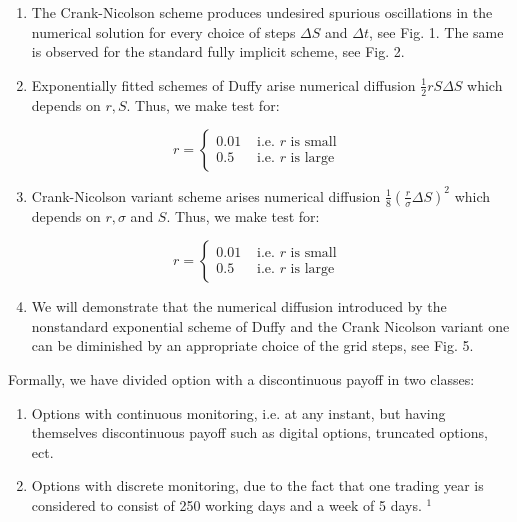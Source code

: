 \documentclass[10pt]{article}
\begin{document}
\begin{enumerate}
  \item The Crank-Nicolson scheme produces undesired spurious oscillations in the numerical solution for every choice of steps $\Delta S$ and $\Delta t$, see Fig. 1. The same is observed for the standard fully implicit scheme, see Fig. 2.
  \item Exponentially fitted schemes of Duffy arise numerical diffusion $\frac{1}{2} r S \Delta S$ which depends on $r, S$. Thus, we make test for:
\end{enumerate}

$$
r= \begin{cases}0.01 & \text { i.e. } r \text { is small } \\ 0.5 & \text { i.e. } r \text { is large }\end{cases}
$$

\begin{enumerate}
  \setcounter{enumi}{2}
  \item Crank-Nicolson variant scheme arises numerical diffusion $\frac{1}{8}\left(\frac{r}{\sigma} \Delta S\right)^{2}$ which depends on $r, \sigma$ and $S$. Thus, we make test for:
\end{enumerate}

$$
r= \begin{cases}0.01 & \text { i.e. } r \text { is small } \\ 0.5 & \text { i.e. } r \text { is large }\end{cases}
$$

\begin{enumerate}
  \setcounter{enumi}{3}
  \item We will demonstrate that the numerical diffusion introduced by the nonstandard exponential scheme of Duffy and the Crank Nicolson variant one can be diminished by an appropriate choice of the grid steps, see Fig. 5.
\end{enumerate}

Formally, we have divided option with a discontinuous payoff in two classes:

\begin{enumerate}
  \item Options with continuous monitoring, i.e. at any instant, but having themselves discontinuous payoff such as digital options, truncated options, ect.
  \item Options with discrete monitoring, due to the fact that one trading year is considered to consist of 250 working days and a week of 5 days. ${ }^{1}$
\end{enumerate}
\end{document}
